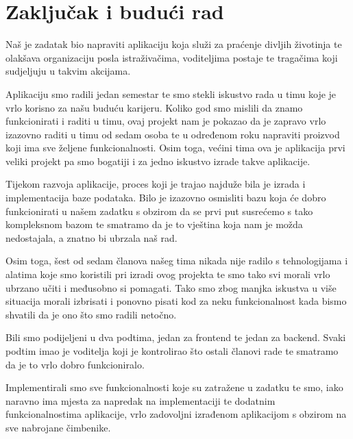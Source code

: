 
\chapter{Zaključak i budući rad}
		
		
		 Naš je zadatak bio napraviti aplikaciju koja služi za praćenje divljih životinja te olakšava organizaciju posla istraživačima, voditeljima postaje te tragačima koji sudjeljuju u takvim akcijama.
		 
		 Aplikaciju smo radili jedan semestar te smo stekli iskustvo rada u timu koje je vrlo korisno za našu buduću karijeru. Koliko god smo mislili da znamo funkcionirati i raditi u timu, ovaj projekt nam je pokazao da je zapravo vrlo izazovno raditi u timu od sedam osoba te u određenom roku napraviti proizvod koji ima sve željene funkcionalnosti. Osim toga, većini tima ova je aplikacija prvi veliki projekt pa smo bogatiji i za jedno iskustvo izrade takve aplikacije.
		 
		 Tijekom razvoja aplikacije, proces koji je trajao najduže bila je izrada i implementacija baze podataka. Bilo je izazovno osmisliti bazu koja će dobro funkcionirati u našem zadatku s obzirom da se prvi put susrećemo s tako kompleksnom bazom te smatramo da je to vještina koja nam je možda nedostajala, a znatno bi ubrzala naš rad. 
		 
		 Osim toga, šest od sedam članova našeg tima nikada nije radilo s tehnologijama i alatima koje smo koristili pri izradi ovog projekta te smo tako svi morali vrlo ubrzano učiti i međusobno si pomagati. Tako smo zbog manjka iskustva u više situacija morali izbrisati i ponovno pisati kod za neku funkcionalnost kada bismo shvatili da je ono što smo radili netočno.
		 
		 Bili smo podijeljeni u dva podtima, jedan za frontend te jedan za backend. Svaki podtim imao je voditelja koji je kontrolirao što ostali članovi rade te smatramo da je to vrlo dobro funkcioniralo. 
		 
		 Implementirali smo sve funkcionalnosti koje su zatražene u zadatku te smo, iako naravno ima mjesta za napredak na implementaciji te dodatnim funkcionalnostima aplikacije, vrlo zadovoljni izrađenom aplikacijom s obzirom na sve nabrojane čimbenike.
		 
		 
		 
		
		
		\eject 